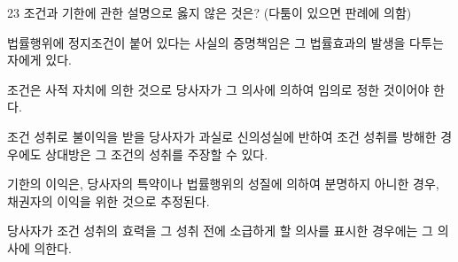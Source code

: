 \begin{question}{23}
조건과 기한에 관한 설명으로 옳지 않은 것은? (다툼이 있으면 판례에 의함)
\begin{choices}
  \item 법률행위에 정지조건이 붙어 있다는 사실의 증명책임은 그 법률효과의 발생을 다투는 자에게 있다.
  \item 조건은 사적 자치에 의한 것으로 당사자가 그 의사에 의하여 임의로 정한 것이어야 한다.
  \item 조건 성취로 불이익을 받을 당사자가 과실로 신의성실에 반하여 조건 성취를 방해한 경우에도 상대방은 그 조건의 성취를 주장할 수 있다.
  \item 기한의 이익은, 당사자의 특약이나 법률행위의 성질에 의하여 분명하지 아니한 경우, 채권자의 이익을 위한 것으로 추정된다.
  \item 당사자가 조건 성취의 효력을 그 성취 전에 소급하게 할 의사를 표시한 경우에는 그 의사에 의한다.
\end{choices}
\end{question}
